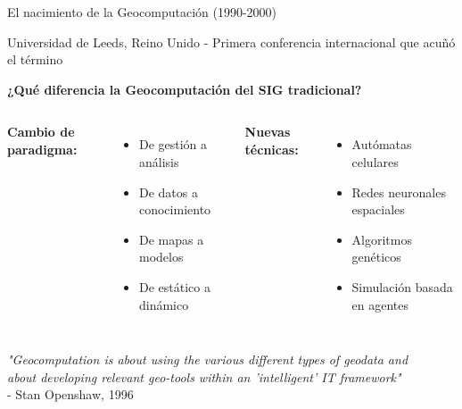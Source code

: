 \documentclass[10pt]{beamer}
\newcommand{\examplebox}[2]{
\begin{tcolorbox}[colframe=usachblue,colback=white,title=#1]
#2
\end{tcolorbox}
}
\begin{document}
\begin{frame}{El nacimiento de la Geocomputación (1990-2000)}
    \examplebox{Conferencia inaugural de Geocomputación (1996)}{
        Universidad de Leeds, Reino Unido - Primera conferencia internacional que acuñó el término
    }
    
    \textbf{¿Qué diferencia la Geocomputación del SIG tradicional?}
    
    \begin{columns}
        \textbf{Cambio de paradigma:}
        \begin{itemize}
            \item De gestión a análisis
            \item De datos a conocimiento
            \item De mapas a modelos
            \item De estático a dinámico
        \end{itemize}
        
        \textbf{Nuevas técnicas:}
        \begin{itemize}
            \item Autómatas celulares
            \item Redes neuronales espaciales
            \item Algoritmos genéticos
            \item Simulación basada en agentes
        \end{itemize}
    \end{columns}
    
    \vspace{0.3cm}
    \begin{center}
        \textit{"Geocomputation is about using the various different types of geodata and\\
        about developing relevant geo-tools within an 'intelligent' IT framework"}\\
        \small{- Stan Openshaw, 1996}
    \end{center}
\end{frame}
\end{document}
